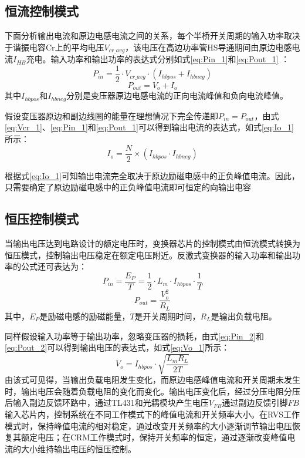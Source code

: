 \subsection{恒流控制模式}

下面分析输出电流和原边电感电流之间的关系，每个半桥开关周期的输入功率取决于谐振电容Cr上的平均电压$V_{cr\_avg}$，该电压在高边功率管HS导通期间由原边电感电流$I_{HB}$充电。输入功率和输出功率的表达式分别如式\eqref{eq:Pin_1}和\eqref{eq:Pout_1} ：
\begin{equation}
    \label{eq:Pin_1}
    P_{in}=\frac{1}{2} \cdot V_{cr\_avg} \cdot (I_{hbpos}+I_{hbneg})
\end{equation}
\begin{equation}
    \label{eq:Pout_1}
    P_{out}=V_o + I_o
\end{equation}
其中$I_{hbpos}$和$I_{hbneg}$分别是变压器原边电感电流的正向电流峰值和负向电流峰值。

假设变压器原边和副边线圈的能量在理想情况下完全传递即$P_{in}=P_{out}$，由式\eqref{eq:Vcr_1}、\eqref{eq:Pin_1}和\eqref{eq:Pout_1}可以得到输出电流的表达式，如式\eqref{eq:Io_1}所示：
\begin{equation}
    \label{eq:Io_1}
    I_o=\frac{N}{2}\times(I_{hbpos} \cdot I_{hbneg})
\end{equation}

根据式\eqref{eq:Io_1}可知输出电流完全取决于原边励磁电感中的正负峰值电流。因此，只需要确定了原边励磁电感中的正负峰值电流即可恒定的向输出电容

\subsection{恒压控制模式}

当输出电压达到电路设计的额定电压时，变换器芯片的控制模式由恒流模式转换为恒压模式，控制输出电压稳定在额定电压附近。反激式变换器的输入功率和输出功率的公式还可表达为：
\begin{equation}
    \label{eq:Pin_2}
    P_{in} = \frac{E_P}{T}=\frac{1}{2} \cdot L_m \cdot I_{hbpos} \cdot \frac{1}{T}
\end{equation}
\begin{equation}
    \label{eq:Pout_2}
    P_{out} = \frac{V_o^2}{R_L} 
\end{equation}
其中，$E_P$是励磁电感的励磁能量，$T$是开关周期时间，$R_L$是输出负载电阻。

同样假设输入功率等于输出功率，忽略变压器的损耗，由式\eqref{eq:Pin_2}和\eqref{eq:Pout_2}可以得到输出电压的表达式，如式\eqref{eq:Vo_1}所示：
\begin{equation}
    \label{eq:Vo_1}
    V_o = I_{hbpos} \cdot \sqrt{\frac{L_m R_L}{2T}}
\end{equation}
由该式可见得，当输出负载电阻发生变化，而原边电感峰值电流和开关周期未发生时，输出电压会随着负载电阻的变化而变化。输出电压变化后，经过分压电阻分压后输入副边反馈环路中，通过TL431和光耦模块产生电压$V_{FB}$通过副边反馈引脚$FB$输入芯片内，控制系统在不同工作模式下的峰值电流和开关频率大小。在RVS工作模式时，保持峰值电流的相对稳定，通过改变开关频率的大小逐渐调节输出电压恢复其额定电压；在CRM工作模式时，保持开关频率的恒定，通过逐渐改变峰值电流的大小维持输出电压的恒压控制。



